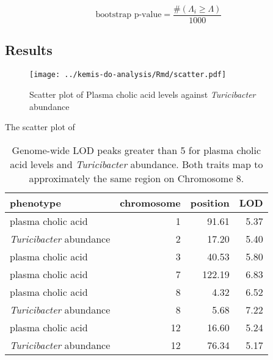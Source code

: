 \documentclass{book}
\begin{document}
\begin{equation}
\text{bootstrap p-value} = \frac{\#(\Lambda_i \geq \Lambda)}{1000}
\label{eq:bootp}
\end{equation}



\subsection{Results}


\begin{figure}
\texttt{[image: ../kemis-do-analysis/Rmd/scatter.pdf]}
\caption{Scatter plot of Plasma cholic acid levels against \emph{Turicibacter} abundance}
\end{figure}

The scatter plot of 


\begin{table}[ht]
\centering
\begin{tabular}{lrrr}
  \hline
phenotype & chromosome & position & LOD \\ 
  \hline
plasma cholic acid &   1 & 91.61 & 5.37 \\ 
 \emph{Turicibacter} abundance &   2 & 17.20 & 5.40 \\ 
  plasma cholic acid &   3 & 40.53 & 5.80 \\ 
  plasma cholic acid &   7 & 122.19 & 6.83 \\ 
  plasma cholic acid &   8 & 4.32 & 6.52 \\ 
 \emph{Turicibacter} abundance &   8 & 5.68 & 7.22 \\ 
  plasma cholic acid &  12 & 16.60 & 5.24 \\ 
 \emph{Turicibacter} abundance &  12 & 76.34 & 5.17 \\ 
   \hline
\end{tabular}
\caption{\label{tab:3c-lod-peaks}Genome-wide LOD peaks greater than 5 for plasma cholic acid levels and \emph{Turicibacter} abundance. Both traits map to approximately the same region on Chromosome 8.}
\end{table}
\end{document}
